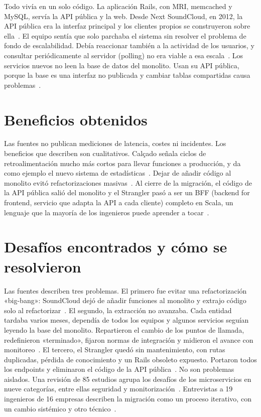 \documentclass[11pt,a4paper]{article}
\begin{document}
Todo vivía en un solo código. La aplicación Rails, con MRI, memcached y MySQL, servía la API pública y la web. Desde Next SoundCloud, en 2012, la API pública era la interfaz principal y los clientes propios se construyeron sobre ella~\cite{calcado2014monolith}. El equipo sentía que solo parchaba el sistema sin resolver el problema de fondo de escalabilidad. Debía reaccionar también a la actividad de los usuarios, y consultar periódicamente al servidor (polling) no era viable a esa escala~\cite{calcado2014monolith}. Los servicios nuevos no leen la base de datos del monolito. Usan su API pública, porque la base es una interfaz no publicada y cambiar tablas compartidas causa problemas~\cite{calcado2014monolith}.

\section{Beneficios obtenidos}

Las fuentes no publican mediciones de latencia, costes ni incidentes. Los beneficios que describen son cualitativos. Calçado señala ciclos de retroalimentación mucho más cortos para llevar funciones a producción, y da como ejemplo el nuevo sistema de estadísticas~\cite{calcado2014monolith}. Dejar de añadir código al monolito evitó refactorizaciones masivas~\cite{calcado2014monolith}. Al cierre de la migración, el código de la API pública salió del monolito y el Strangler pasó a ser un BFF (backend for frontend, servicio que adapta la API a cada cliente) completo en Scala, un lenguaje que la mayoría de los ingenieros puede aprender a tocar~\cite{obrien2022strangler}.

\section{Desafíos encontrados y cómo se resolvieron}

Las fuentes describen tres problemas. El primero fue evitar una refactorización «big-bang»: SoundCloud dejó de añadir funciones al monolito y extrajo código solo al refactorizar~\cite{calcado2014monolith}. El segundo, la extracción no avanzaba. Cada entidad tardaba varios meses, dependía de todos los equipos y algunos servicios seguían leyendo la base del monolito. Repartieron el cambio de los puntos de llamada, redefinieron «terminado», fijaron normas de integración y midieron el avance con monitoreo~\cite{stuart2016monolith}. El tercero, el Strangler quedó sin mantenimiento, con rutas duplicadas, pérdida de conocimiento y un Rails obsoleto expuesto. Portaron todos los endpoints y eliminaron el código de la API pública~\cite{obrien2022strangler}. No son problemas aislados. Una revisión de 85 estudios agrupa los desafíos de los microservicios en nueve categorías, entre ellas seguridad y monitorización~\cite{soylemez2022challenges}. Entrevistas a 19 ingenieros de 16 empresas describen la migración como un proceso iterativo, con un cambio sistémico y otro técnico~\cite{ayas2023empirical}.
\end{document}
